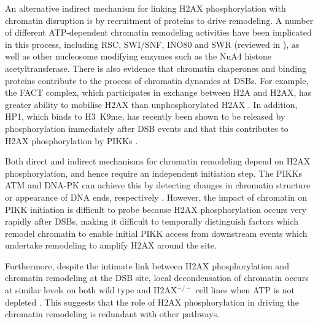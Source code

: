 An alternative indirect mechanism for linking H2AX phosphorylation
with chromatin disruption is by recruitment of proteins to drive
remodeling. A number of different ATP-dependent chromatin remodeling
activities have been implicated in this process, including RSC,
SWI/SNF, INO80 and SWR (reviewed in \citet{JAD07}), as well as other
nucleosome modifying enzymes such as the NuA4 histone
acetyltransferase. There is also evidence that chromatin chaperones
and binding proteins contribute to the process of chromatin dynamics
at DSBs. For example, the FACT complex, which participates in exchange
between H2A and H2AX, has greater ability to mobilise \textgamma H2AX
than unphosphorylated H2AX \citep{KHHK+08}. In addition, HP1\textbeta,
which binds to H3~K9me, has recently been shown to be released by
phosphorylation immediately after DSB events and that this contributes
to H2AX phosphorylation by PIKKs \citep{AJB+08}.

Both direct and indirect mechanisms for chromatin remodeling depend on
H2AX phosphorylation, and hence require an independent initiation
step. The PIKKs ATM and DNA-PK can achieve this by detecting changes
in chromatin structure or appearance of DNA ends, respectively
\citep{CJB03,BC04}.
However, the impact of chromatin on PIKK initiation is difficult to
probe because H2AX phosphorylation occurs very rapidly after DSBs,
making it difficult to temporally distinguish factors which remodel
chromatin to enable initial PIKK access from downstream events which
undertake remodeling to amplify \textgamma H2AX around the site.

Furthermore, despite the intimate link between H2AX phosphorylation
and chromatin remodeling at the DSB site, local decondensation of
chromatin occurs at similar levels on both wild type and H2AX$^{-/-}$
cell lines when ATP is not depleted \citep{MJK+06}. This suggests that
the role of H2AX phosphorylation in driving the chromatin remodeling
is redundant with other pathways.

